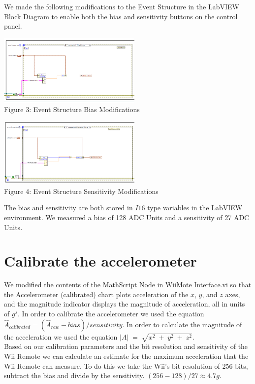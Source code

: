 \documentclass[twoside]{article}
\begin{document}
\begin{multicols}{2}
We made the following modifications to the Event Structure in the LabVIEW Block Diagram to enable both the bias and sensitivity buttons on the control panel.

\begin{center}
\includegraphics*[width = 7cm]{FIG3.png}\\
Figure 3: Event Structure Bias Modifications
\end{center}

\begin{center}
\includegraphics*[width = 7cm]{FIG4.png}\\
Figure 4: Event Structure Sensitivity Modifications
\end{center}

\noindent The bias and sensitivity are both stored in $I16$ type variables in the LabVIEW environment. We measured a bias of 128 ADC Units and a sensitivity of 27 ADC Units.


\section{Calibrate the accelerometer}

We modified the contents of the MathScript Node in WiiMote Interface.vi so that the Accelerometer (calibrated) chart plots acceleration of the $x$, $y$, and $z$ axes, and the magnitude indicator displays the magnitude of acceleration, all in units of $g^s$. In order to calibrate the accelerometer we used the equation $\hat{A}_{calibrated} = (\hat{A}_{raw} - bias) / sensitivity$. In order to calculate the magnitude of the acceleration we used the equation $|A|\; =\; \sqrt{x^{2}\; +\; y^{2}\; +\; z^{2}}$. \\

\noindent Based on our calibration parameters and the bit resolution and sensitivity of the Wii Remote we can calculate an estimate for the maximum acceleration that the Wii Remote can measure. To do this we take the Wii's bit resolution of 256 bits, subtract the bias and divide by the sensitivity. $(256 - 128) / 27 \approx 4.7g$.\\


\end{multicols}
\end{document}
